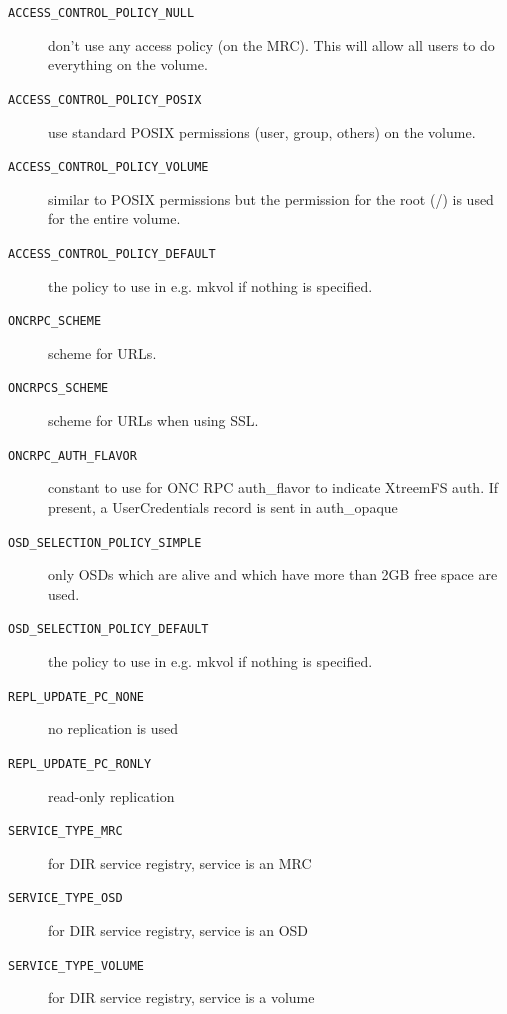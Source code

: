 \begin{description}
	\item[\texttt{ACCESS\_CONTROL\_POLICY\_NULL}] don't use any access policy (on the MRC). This will allow all users to do everything on the volume.

	\item[\texttt{ACCESS\_CONTROL\_POLICY\_POSIX}] use standard POSIX permissions (user, group, others) on the volume.

	\item[\texttt{ACCESS\_CONTROL\_POLICY\_VOLUME}] similar to POSIX permissions but the permission for the root (/) is used for the entire volume.

	\item[\texttt{ACCESS\_CONTROL\_POLICY\_DEFAULT}] the policy to use in e.g. mkvol if nothing is specified.

	\item[\texttt{ONCRPC\_SCHEME}] scheme for URLs.

	\item[\texttt{ONCRPCS\_SCHEME}] scheme for URLs when using SSL.

	\item[\texttt{ONCRPC\_AUTH\_FLAVOR}] constant to use for ONC RPC auth\_flavor to indicate XtreemFS auth. If present, a UserCredentials record is sent in auth\_opaque

	\item[\texttt{OSD\_SELECTION\_POLICY\_SIMPLE}] only OSDs which are alive and which have more than 2GB free space are used.

	\item[\texttt{OSD\_SELECTION\_POLICY\_DEFAULT}] the policy to use in e.g. mkvol if nothing is specified.

	\item[\texttt{REPL\_UPDATE\_PC\_NONE}] no replication is used

	\item[\texttt{REPL\_UPDATE\_PC\_RONLY}] read-only replication

	\item[\texttt{SERVICE\_TYPE\_MRC}] for DIR service registry, service is an MRC

	\item[\texttt{SERVICE\_TYPE\_OSD}] for DIR service registry, service is an OSD

	\item[\texttt{SERVICE\_TYPE\_VOLUME}] for DIR service registry, service is a volume


\end{description}
